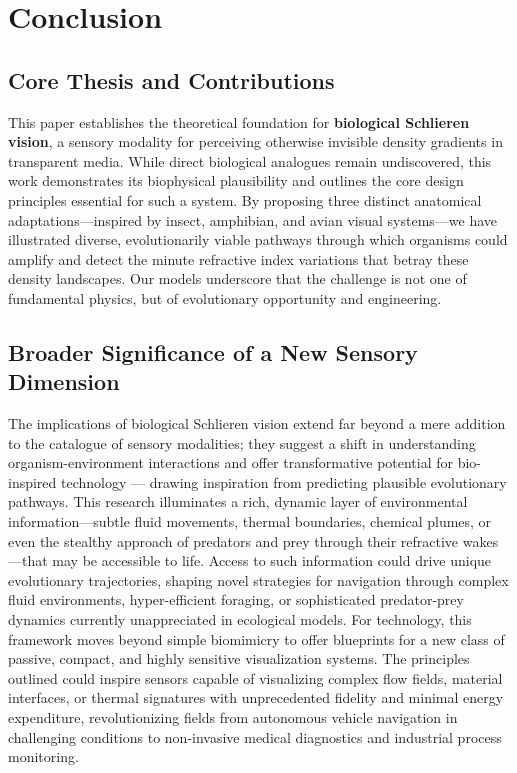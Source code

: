 \documentclass[11pt]{article}
\begin{document}
\section{Conclusion}

\subsection{Core Thesis and Contributions}

This paper establishes the theoretical foundation for \textbf{biological Schlieren vision}, a sensory modality for perceiving otherwise invisible density gradients in transparent media. While direct biological analogues remain undiscovered, this work demonstrates its biophysical plausibility and outlines the core design principles essential for such a system. By proposing three distinct anatomical adaptations---inspired by insect, amphibian, and avian visual systems---we have illustrated diverse, evolutionarily viable pathways through which organisms could amplify and detect the minute refractive index variations that betray these density landscapes. Our models underscore that the challenge is not one of fundamental physics, but of evolutionary opportunity and engineering.

\subsection{Broader Significance of a New Sensory Dimension}

The implications of biological Schlieren vision extend far beyond a mere addition to the catalogue of sensory modalities; they suggest a shift in understanding organism-environment interactions and offer transformative potential for bio-inspired technology — drawing inspiration from predicting plausible evolutionary pathways.
This research illuminates a rich, dynamic layer of environmental information---subtle fluid movements, thermal boundaries, chemical plumes, or even the stealthy approach of predators and prey through their refractive wakes---that may be accessible to life. Access to such information could drive unique evolutionary trajectories, shaping novel strategies for navigation through complex fluid environments, hyper-efficient foraging, or sophisticated predator-prey dynamics currently unappreciated in ecological models.
For technology, this framework moves beyond simple biomimicry to offer blueprints for a new class of passive, compact, and highly sensitive visualization systems. The principles outlined could inspire sensors capable of visualizing complex flow fields, material interfaces, or thermal signatures with unprecedented fidelity and minimal energy expenditure, revolutionizing fields from autonomous vehicle navigation in challenging conditions to non-invasive medical diagnostics and industrial process monitoring.
\end{document}
